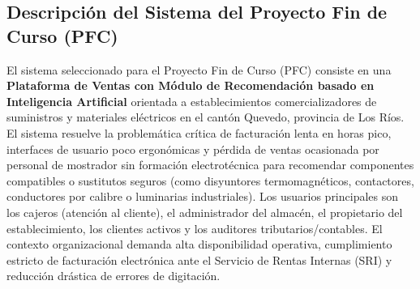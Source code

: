 \subsection{Descripción del Sistema del Proyecto Fin de Curso (PFC)}
El sistema seleccionado para el Proyecto Fin de Curso (PFC) consiste en una \textbf{Plataforma de Ventas con Módulo de Recomendación basado en Inteligencia Artificial} orientada a establecimientos comercializadores de suministros y materiales eléctricos en el cantón Quevedo, provincia de Los Ríos. El sistema resuelve la problemática crítica de facturación lenta en horas pico, interfaces de usuario poco ergonómicas y pérdida de ventas ocasionada por personal de mostrador sin formación electrotécnica para recomendar componentes compatibles o sustitutos seguros (como disyuntores termomagnéticos, contactores, conductores por calibre o luminarias industriales). Los usuarios principales son los cajeros (atención al cliente), el administrador del almacén, el propietario del establecimiento, los clientes activos y los auditores tributarios/contables. El contexto organizacional demanda alta disponibilidad operativa, cumplimiento estricto de facturación electrónica ante el Servicio de Rentas Internas (SRI) y reducción drástica de errores de digitación.
